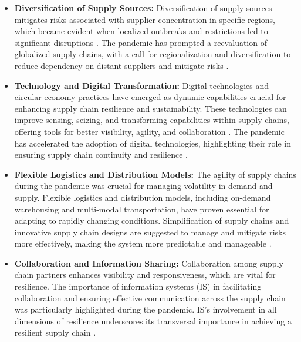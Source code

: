 \begin{itemize}
    \item \textbf{Diversification of Supply Sources: }Diversification of supply sources mitigates risks associated with supplier concentration in specific regions, which became evident when localized outbreaks and restrictions led to significant disruptions \parencite{Cherrafi2022DigitalEra}. The pandemic has prompted a reevaluation of globalized supply chains, with a call for regionalization and diversification to reduce dependency on distant suppliers and mitigate risks \parencite{Cherrafi2022DigitalEra}.

    \item \textbf{Technology and Digital Transformation: }Digital technologies and circular economy practices have emerged as dynamic capabilities crucial for enhancing supply chain resilience and sustainability. These technologies can improve sensing, seizing, and transforming capabilities within supply chains, offering tools for better visibility, agility, and collaboration \parencite{Cherrafi2022DigitalEra}. The pandemic has accelerated the adoption of digital technologies, highlighting their role in ensuring supply chain continuity and resilience \parencite{Mishra2024RedefiningFactors, Cherrafi2022DigitalEra}.

    \item \textbf{Flexible Logistics and Distribution Models: }The agility of supply chains during the pandemic was crucial for managing volatility in demand and supply. Flexible logistics and distribution models, including on-demand warehousing and multi-modal transportation, have proven essential for adapting to rapidly changing conditions. Simplification of supply chains and innovative supply chain designs are suggested to manage and mitigate risks more effectively, making the system more predictable and manageable \parencite{Mishra2024RedefiningFactors}.

    \item \textbf{Collaboration and Information Sharing: }Collaboration among supply chain partners enhances visibility and responsiveness, which are vital for resilience. The importance of information systems (IS) in facilitating collaboration and ensuring effective communication across the supply chain was particularly highlighted during the pandemic. IS's involvement in all dimensions of resilience underscores its transversal importance in achieving a resilient supply chain \parencite{Michel2023DimensionsPandemic}.


\end{itemize}
